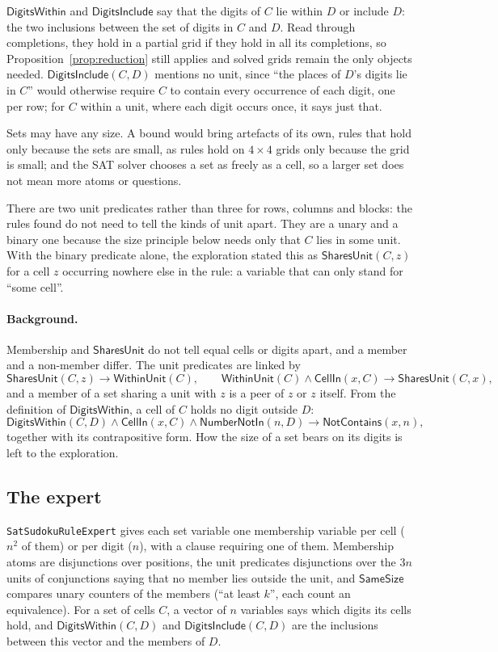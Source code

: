 \documentclass[11pt,a4paper]{article}
\theoremstyle{definition}
\theoremstyle{remark}
\newcommand{\code}[1]{\texttt{#1}}
\newcommand{\pred}[1]{\mathsf{#1}}
\newcommand{\NotContains}{\pred{NotContains}}
\begin{document}
$\pred{DigitsWithin}$ and $\pred{DigitsInclude}$ say that the digits of $C$ lie within $D$ or include $D$: the two inclusions between the set of digits in $C$ and $D$. Read through completions, they hold in a partial grid if they hold in all its completions, so Proposition~\ref{prop:reduction} still applies and solved grids remain the only objects needed. $\pred{DigitsInclude}(C, D)$ mentions no unit, since ``the places of $D$'s digits lie in $C$'' would otherwise require $C$ to contain every occurrence of each digit, one per row; for $C$ within a unit, where each digit occurs once, it says just that.

Sets may have any size. A bound would bring artefacts of its own, rules that hold only because the sets are small, as rules hold on $4 \times 4$ grids only because the grid is small; and the SAT solver chooses a set as freely as a cell, so a larger set does not mean more atoms or questions.

There are two unit predicates rather than three for rows, columns and blocks: the rules found do not need to tell the kinds of unit apart. They are a unary and a binary one because the size principle below needs only that $C$ lies in some unit. With the binary predicate alone, the exploration stated this as $\pred{SharesUnit}(C, z)$ for a cell $z$ occurring nowhere else in the rule: a variable that can only stand for ``some cell''.

\paragraph{Background.} Membership and $\pred{SharesUnit}$ do not tell equal cells or digits apart, and a member and a non-member differ. The unit predicates are linked by
\[
  \pred{SharesUnit}(C, z) \to \pred{WithinUnit}(C), \qquad
  \pred{WithinUnit}(C) \wedge \pred{CellIn}(x, C) \to \pred{SharesUnit}(C, x),
\]
and a member of a set sharing a unit with $z$ is a peer of $z$ or $z$ itself. From the definition of $\pred{DigitsWithin}$, a cell of $C$ holds no digit outside $D$:
\[
  \pred{DigitsWithin}(C, D) \wedge \pred{CellIn}(x, C) \wedge \pred{NumberNotIn}(n, D) \to \NotContains(x, n),
\]
together with its contrapositive form. How the size of a set bears on its digits is left to the exploration.

\subsection{The expert}

\code{SatSudokuRuleExpert} gives each set variable one membership variable per cell ($n^2$ of them) or per digit ($n$), with a clause requiring one of them. Membership atoms are disjunctions over positions, the unit predicates disjunctions over the $3n$ units of conjunctions saying that no member lies outside the unit, and $\pred{SameSize}$ compares unary counters of the members (``at least $k$'', each count an equivalence). For a set of cells $C$, a vector of $n$ variables says which digits its cells hold, and $\pred{DigitsWithin}(C, D)$ and $\pred{DigitsInclude}(C, D)$ are the inclusions between this vector and the members of $D$.
\end{document}
